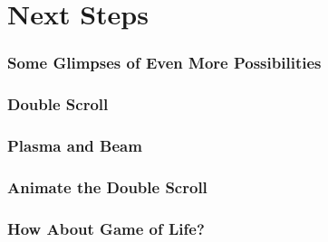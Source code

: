 \documentclass{beamer}
\begin{document}
    \section{Next Steps}\label{sct:allRes}
        \begin{frame}
            \frametitle{Some Glimpses of Even More Possibilities}
        \end{frame}
        \begin{frame}
            \frametitle{Double Scroll}
        \end{frame}
        \begin{frame}
            \frametitle{ Plasma and Beam}
        \end{frame}
        \begin{frame}
            \frametitle{Animate the Double Scroll}
        \end{frame}
        \begin{frame}
            \frametitle{How About Game of Life?}
        \end{frame}
\end{document}
